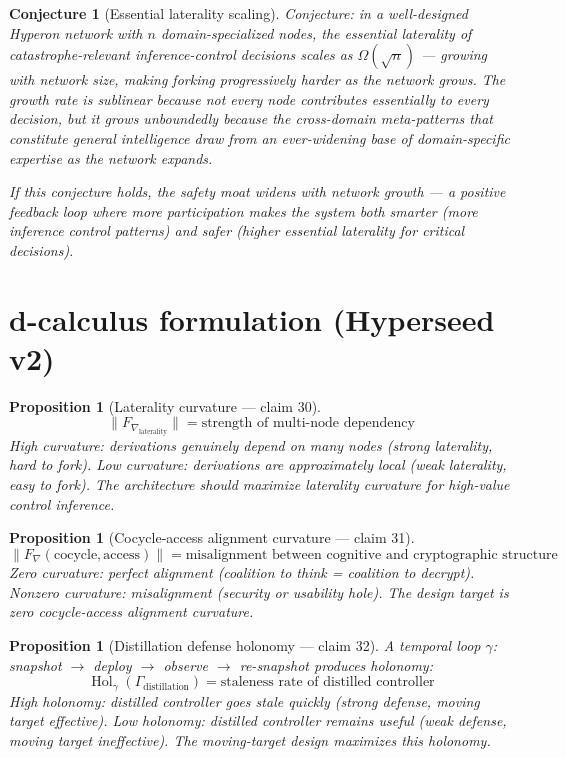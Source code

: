 \documentclass[11pt,a4paper]{article}
\newtheorem{proposition}[definition]{Proposition}
\newtheorem{conjecture}[definition]{Conjecture}
\begin{document}
\begin{conjecture}[Essential laterality scaling]
Conjecture: in a well-designed Hyperon network with $n$ domain-specialized
nodes, the essential laterality of catastrophe-relevant inference-control
decisions scales as $\Omega(\sqrt{n})$ --- growing with network size,
making forking progressively harder as the network grows. The growth
rate is sublinear because not every node contributes essentially to
every decision, but it grows unboundedly because the cross-domain
meta-patterns that constitute general intelligence draw from an
ever-widening base of domain-specific expertise as the network expands.

If this conjecture holds, the safety moat widens with network growth
--- a positive feedback loop where more participation makes the system
both smarter (more inference control patterns) and safer (higher
essential laterality for critical decisions).
\end{conjecture}

\section{d-calculus formulation (Hyperseed v2)}

\begin{proposition}[Laterality curvature --- claim 30]
\label{prop:lat_curv}
\[
  \|F_{\nabla_{\text{laterality}}}\| = \text{strength of multi-node
    dependency}
\]
High curvature: derivations genuinely depend on many nodes (strong
laterality, hard to fork). Low curvature: derivations are
approximately local (weak laterality, easy to fork). The architecture
should maximize laterality curvature for high-value control inference.
\end{proposition}

\begin{proposition}[Cocycle-access alignment curvature --- claim 31]
\label{prop:ca_curv}
\[
  \|F_\nabla(\text{cocycle}, \text{access})\| = \text{misalignment
    between cognitive and cryptographic structure}
\]
Zero curvature: perfect alignment (coalition to think = coalition to
decrypt). Nonzero curvature: misalignment (security or usability hole).
The design target is zero cocycle-access alignment curvature.
\end{proposition}

\begin{proposition}[Distillation defense holonomy --- claim 32]
\label{prop:distill_hol}
A temporal loop $\gamma$: snapshot $\to$ deploy $\to$ observe $\to$
re-snapshot produces holonomy:
\[
  \operatorname{Hol}_\gamma(\Gamma_{\text{distillation}}) =
    \text{staleness rate of distilled controller}
\]
High holonomy: distilled controller goes stale quickly (strong
defense, moving target effective). Low holonomy: distilled controller
remains useful (weak defense, moving target ineffective). The
moving-target design maximizes this holonomy.
\end{proposition}
\end{document}

